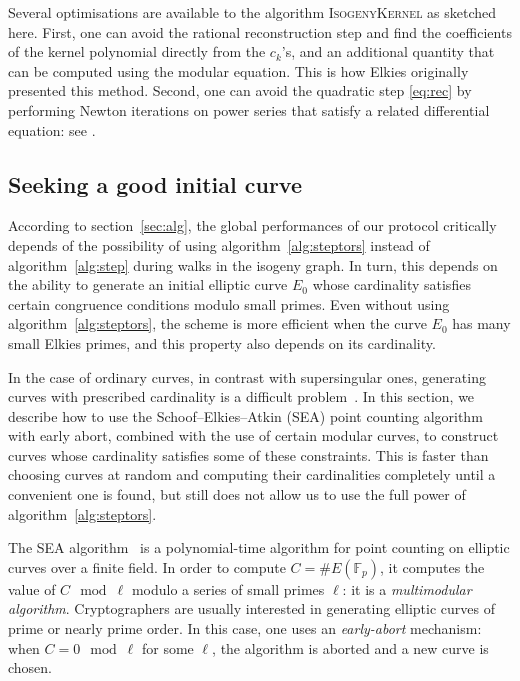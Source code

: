\documentclass{article}
\newcommand{\F}{\mathbb{F}}
\newcommand{\algstyle}[1]{\textsc{#1}}
\theoremstyle{definition}
\begin{document}
Several optimisations are available to the algorithm \algstyle{IsogenyKernel}
as sketched here. First, one can avoid the rational reconstruction step and
find the coefficients of the kernel polynomial directly from the $c_k$'s,
and an additional quantity that can be computed using the modular equation.
This is how Elkies originally presented this method. Second, one can avoid
the quadratic step \ref{eq:rec} by performing Newton iterations on power
series that satisfy a related differential equation: see \cite{}.


\subsection{Seeking a good initial curve}

According to section~\ref{sec:alg}, the global performances of our protocol
critically depends of the possibility of using algorithm~\ref{alg:steptors}
instead of algorithm~\ref{alg:step} during walks in the isogeny graph.
In turn, this depends on the ability to generate an initial elliptic curve
$E_0$ whose cardinality satisfies certain congruence conditions modulo
small primes. Even without using algorithm~\ref{alg:steptors}, the scheme is
more efficient when the curve $E_0$ has many small Elkies primes, and this
property also depends on its cardinality.

In the case of ordinary curves, in contrast with supersingular ones,
generating curves with prescribed cardinality is a difficult problem~\cite{todo}.
In this section, we describe how to use the Schoof--Elkies--Atkin (SEA) point counting
algorithm with early abort, combined with the use of certain modular curves,
to construct curves whose cardinality satisfies some of these constraints.
This is faster than choosing curves at random and computing their cardinalities
completely until a convenient one is found, but still does not allow us
to use the full power of algorithm~\ref{alg:steptors}.

The SEA algorithm~\cite{todo:refsSEA} is a polynomial-time algorithm for
point counting on elliptic curves over a finite field. In order to compute
$C = \# E(\F_p)$, it computes the value of $C\mod\ell$ modulo a series
of small primes $\ell$: it is a \emph{multimodular algorithm}.
Cryptographers are usually interested in generating elliptic curves of
prime or nearly prime order. In this case, one uses an \emph{early-abort}
mechanism: when $C = 0\mod\ell$ for some $\ell$, the algorithm is aborted
and a new curve is chosen.
\end{document}
